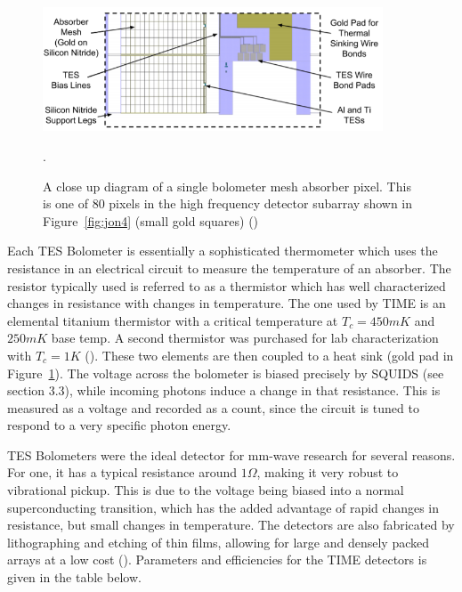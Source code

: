 \documentclass[manuscript]{aastex}
\begin{document}
\begin{figure}[H]
\centering
\captionsetup{width=0.9\textwidth}
\includegraphics[width=0.9\textwidth]{jon5.PNG}
\caption[Single TES Detector Pixel -(\cite{Hunacek2016b})]{A close up diagram of a single bolometer mesh absorber pixel. This is one of 80 pixels in the high frequency detector subarray shown in Figure~\ref{fig:jon4} (small gold squares) (\cite{Hunacek2016b})}. 
\label{fig:jon5}
\vspace{-0.8cm}
\end{figure}

Each TES Bolometer is essentially a sophisticated thermometer which uses the resistance in an electrical circuit to measure the temperature of an absorber. The resistor typically used is referred to as a thermistor which has well characterized changes in resistance with changes in temperature. The one used by TIME is an elemental titanium thermistor with a critical temperature at \(T_{c} = 450 mK\) and \(250 mK\) base temp. A second thermistor was purchased for lab characterization with \(T_{c} = 1 K\) (\cite{Crites2014}). These two elements are then coupled to a heat sink (gold pad in Figure~\ref{fig:jon5}). The voltage across the bolometer is biased precisely by SQUIDS (see section 3.3), while incoming photons induce a change in that resistance. This is measured as a voltage and recorded as a count, since the circuit is tuned to respond to a very specific photon energy. 

TES Bolometers were the ideal detector for mm-wave research for several reasons. For one, it has a typical resistance around \(1\Omega\), making it very robust to vibrational pickup. This is due to the voltage being biased into a normal superconducting transition, which has the added advantage of rapid changes in resistance, but small changes in temperature. The detectors are also fabricated by lithographing and etching of thin films, allowing for large and densely packed arrays at a low cost (\cite{O'Brient2010}). Parameters and efficiencies for the TIME detectors is given in the table below.
\end{document}

